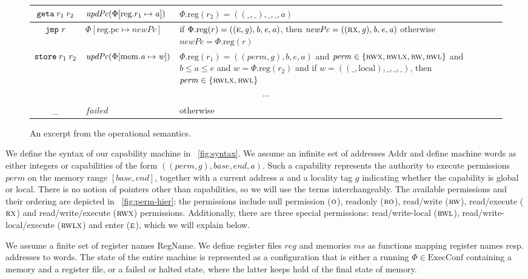 \documentclass[acmsmall,review]{acmart}\settopmatter{printfolios=true}
\newcommand{\update}[2]{[#1 \mapsto #2]}
\newcommand\lau[1]{{\color{purple} \sf \footnotesize {LS: #1}}\\}
\newcommand{\var}[1]{\mathit{#1}}
\newcommand{\hs}{\var{ms}}
\newcommand{\ms}{\hs}
\newcommand{\lv}{\var{r}}
\newcommand{\gl}{\var{g}}
\newcommand{\pcreg}{\mathrm{pc}}
\newcommand{\addr}{\var{a}}
\newcommand{\start}{\var{b}}
\newcommand{\addrend}{\var{e}}
\newcommand{\reg}{\var{reg}}
\newcommand{\perm}{\var{perm}}
\newcommand{\stdcap}[1][(\perm,\gl)]{\left(#1,\start,\addrend,\addr \right)}
\newcommand{\plainproj}[1]{\mathrm{#1}}
\newcommand{\memreg}[1][\Phi]{#1.\plainproj{reg}}
\newcommand{\updateHeap}[3][\Phi]{#1\update{\plainproj{mem}.#2}{#3}}
\newcommand{\updateReg}[3][\Phi]{#1\update{\plainproj{reg}.#2}{#3}}
\newcommand{\failed}{\mathit{failed}}
\newcommand{\plainfun}[2]{
  \ifthenelse{\equal{#2}{}}
  {\mathit{#1}}
  {\mathit{#1}(#2)}
}
\newcommand{\stdUpdatePc}[1]{\plainfun{updPc}{#1}}
\newcommand{\plaindom}[1]{\mathrm{#1}}
\newcommand{\Addrs}{\plaindom{Addr}}
\newcommand{\ExecConfs}{\plaindom{ExecConf}}
\newcommand{\RegName}{\plaindom{RegName}}
\newcommand{\refreg}[1]{#1}
\newcommand{\refheap}[1]{#1}
\newcommand{\zinstr}[1]{\mathtt{#1}}
\newcommand{\oneinstr}[2]{
  \ifthenelse{\equal{#2}{}}
  {\zinstr{#1}}
  {\zinstr{#1} \; #2}
}
\newcommand{\jmp}[1]{\oneinstr{jmp}{#1}}
\newcommand{\twoinstr}[3]{
  \ifthenelse{\equal{#2#3}{}}
  {\zinstr{#1}}
  {\zinstr{#1} \; #2 \; #3}
}
\newcommand{\geta}[2]{\twoinstr{geta}{#1}{#2}}
\newcommand{\store}[2]{\twoinstr{store}{#1}{#2}}
\newcommand{\plainperm}[1]{\textsc{#1}}
\newcommand{\noperm}{\plainperm{o}}
\newcommand{\readonly}{\plainperm{ro}}
\newcommand{\readwrite}{\plainperm{rw}}
\newcommand{\exec}{\plainperm{rx}}
\newcommand{\entry}{\plainperm{e}}
\newcommand{\rwx}{\plainperm{rwx}}
\newcommand{\readwritel}{\plainperm{rwl}}
\newcommand{\rwlx}{\plainperm{rwlx}}
\newcommand{\plainlocality}[1]{\mathrm{#1}}
\newcommand{\local}{\plainlocality{local}}
\begin{document}
\begin{figure}
\begin{tabular}{|c|p{3.4cm}|p{7.3cm}|}
    \hline
    $\geta{\refreg{r_1}}{\refreg{r_2}}$ & $\stdUpdatePc{\updateReg{r_1}{\addr}}$ &
                                                $\memreg(r_2) = ((\_,\_),\_,\_,\addr)$\\
    \hline
    $\jmp{\lv}$&$\updateReg{\pcreg}{\var{newPc}}$& if $\memreg(r) = ((\entry,\gl),\start,\addrend,\addr)$, then $\var{newPc} = ((\exec,\gl),\start,\addrend,\addr)$ otherwise $\var{newPc} = \memreg(r)$\\
    \hline
    $\store{\refheap{r_1}}{\refreg{r_2}}$&$\stdUpdatePc{\updateHeap{\addr}{\var{w}}}$&$\memreg(r_1) = \stdcap$ and $\perm \in \{ \rwx, \rwlx, \readwrite, \readwritel\}$  and $\start \leq \addr \leq \addrend$ and $\var{w} = \memreg(r_2)$
                                                                                       and if $\var{w} = ((\_,\local),\_,\_,\_)$, then $\perm \in \{\rwlx,\readwritel \}$\\
    \hline
    \multicolumn{3}{|c|}{$\cdots$}\\
    \hline
    \_&$\failed$&otherwise\\
    \hline
  \end{tabular}
  \caption{An excerpt from the operational semantics.}
  \label{fig:op-sem}
\end{figure}

We define the syntax of our capability machine in \figurename~\ref{fig:syntax}.
We assume an infinite set of addresses $\Addrs$ and define machine words as
either integers or capabilities of the form
$((\perm,\gl),\var{base},\var{end},\addr)$. Such a capability represents the
authority to execute permissions $\perm$ on the memory range
$[\var{base},\var{end}]$, together with a current address $\addr$ and a locality tag
$\gl$ indicating whether the capability is global or local. There is no notion
of pointers other than capabilities, so we will use the terms interchangeably.
The available permissions and their ordering are depicted in
\figurename~\ref{fig:perm-hier}: the permissions include null permission
($\noperm$), readonly ($\readonly$), read/write ($\readwrite$), read/execute
($\exec$) and read/write/execute ($\rwx$) permissions. Additionally, there are
three special permissions: read/write-local ($\readwritel$), read/write-local/execute
($\rwlx$) and enter ($\entry$), which we will explain below.

We assume a finite set of register names $\RegName$. We define register files
$\reg$ and memories $\ms$ as functions mapping register names resp. addresses to
words. The state of the entire machine is represented as a configuration that is
either a running $\Phi \in \ExecConfs$ containing a memory and a register file,
or a failed or halted state, where the latter keeps hold of the final state of
memory.
\end{document}

